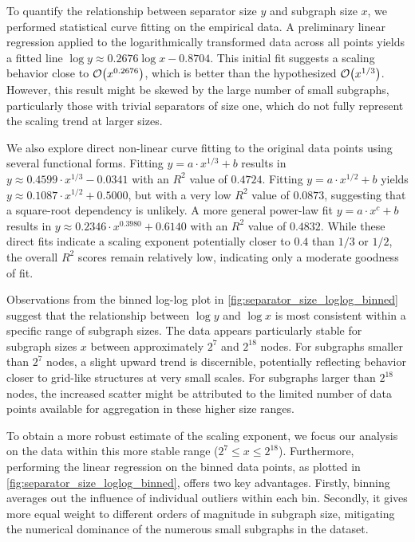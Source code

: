 To quantify the relationship between separator size \( y \) and subgraph size \( x \), we performed statistical curve fitting on the empirical data.
A preliminary linear regression applied to the logarithmically transformed data across all points yields a fitted line \( \log y \approx 0.2676 \log x - 0.8704 \).
This initial fit suggests a scaling behavior close to \( \mathcal{O}\!\left(x^{0.2676}\right) \), which is better than the hypothesized \( \mathcal{O}\!\left(x^{1/3}\right) \).
However, this result might be skewed by the large number of small subgraphs, particularly those with trivial separators of size one, which do not fully represent the scaling trend at larger sizes.

We also explore direct non-linear curve fitting to the original data points using several functional forms.
Fitting \( y = a \cdot x^{1/3} + b \) results in \( y \approx 0.4599 \cdot x^{1/3} - 0.0341 \) with an \( R^2 \) value of \( 0.4724 \).
Fitting \( y = a \cdot x^{1/2} + b \) yields \( y \approx 0.1087 \cdot x^{1/2} + 0.5000 \), but with a very low \( R^2 \) value of \( 0.0873 \), suggesting that a square-root dependency is unlikely.
A more general power-law fit \( y = a \cdot x^c + b \) results in \( y \approx 0.2346 \cdot x^{0.3980} + 0.6140 \) with an \( R^2 \) value of \( 0.4832 \).
While these direct fits indicate a scaling exponent potentially closer to \( 0.4 \) than \( 1/3 \) or \( 1/2 \), the overall \( R^2 \) scores remain relatively low, indicating only a moderate goodness of fit.

Observations from the binned log-log plot in \cref{fig:separator_size_loglog_binned} suggest that the relationship between \( \log y \) and \( \log x \) is most consistent within a specific range of subgraph sizes.
The data appears particularly stable for subgraph sizes \( x \) between approximately \( 2^7 \) and \( 2^{18} \) nodes.
For subgraphs smaller than \( 2^7 \) nodes, a slight upward trend is discernible, potentially reflecting behavior closer to grid-like structures at very small scales.
For subgraphs larger than \( 2^{18} \) nodes, the increased scatter might be attributed to the limited number of data points available for aggregation in these higher size ranges.

To obtain a more robust estimate of the scaling exponent, we focus our analysis on the data within this more stable range (\( 2^7 \le x \le 2^{18} \)).
Furthermore, performing the linear regression on the binned data points, as plotted in \cref{fig:separator_size_loglog_binned}, offers two key advantages.
Firstly, binning averages out the influence of individual outliers within each bin.
Secondly, it gives more equal weight to different orders of magnitude in subgraph size, mitigating the numerical dominance of the numerous small subgraphs in the dataset.

